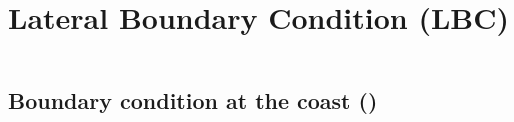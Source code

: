 \documentclass[../tex_main/NEMO_manual]{subfiles}
\begin{document}
\chapter{Lateral Boundary Condition (LBC)}
\label{chap:LBC}
\minitoc

\newpage
$\ $\newline    %



\section{Boundary condition at the coast (\protect{})}
\label{sec:LBC_coast}


\end{document}
